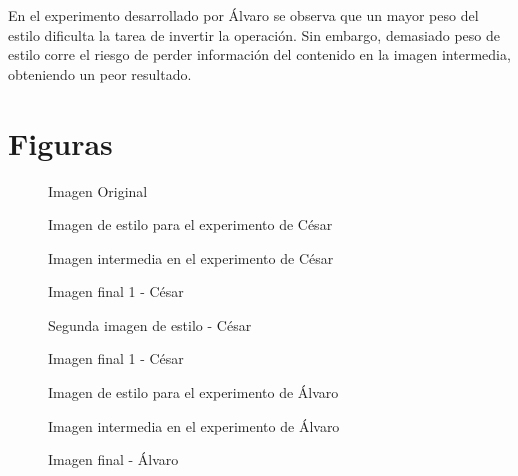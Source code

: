 \documentclass[es]{uc3mreport}
\begin{document}
\begin{report}
            En el experimento desarrollado por Álvaro se observa que un mayor
            peso del estilo dificulta la tarea de invertir la operación. Sin
            embargo, demasiado peso de estilo corre el riesgo de perder información
            del contenido en la imagen intermedia, obteniendo un peor resultado.


    \section{Figuras}

    \begin{figure}
        \caption{Imagen Original}
        \label{original}
    \end{figure}

    \begin{figure}
        \caption{Imagen de estilo para el experimento de César}
        \label{joan-miro}
    \end{figure}

    \begin{figure}
        \caption{Imagen intermedia en el experimento de César}
        \label{intermedio-clm}
    \end{figure}

    \begin{figure}
        \caption{Imagen final 1 - César}
        \label{final-clm-1}
    \end{figure}

    \begin{figure}
        \caption{Segunda imagen de estilo - César}
        \label{city-2}
    \end{figure}

    \begin{figure}
        \caption{Imagen final 1 - César}
        \label{final-clm-2}
    \end{figure}

    \begin{figure}
        \caption{Imagen de estilo para el experimento de Álvaro}
        \label{tm}
    \end{figure}

    \begin{figure}
        \caption{Imagen intermedia en el experimento de Álvaro}
        \label{intermedio-age}
    \end{figure}

    \begin{figure}
        \caption{Imagen final - Álvaro}
        \label{final-age}
    \end{figure}

    \end{report}
\end{document}

